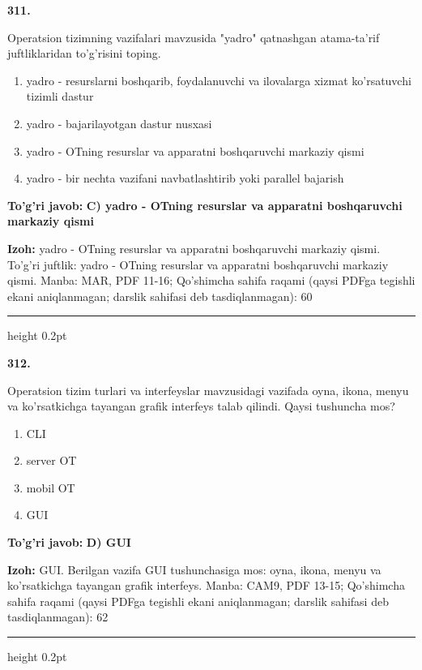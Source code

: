 \documentclass[10pt,a4paper]{article}
\begin{document}
{\bfseries\sffamily\color{ink} 311.}
\par
Operatsion tizimning vazifalari mavzusida "yadro" qatnashgan atama-ta'rif juftliklaridan to'g'risini toping.
\begin{enumerate}[label=\Alph*),leftmargin=9mm]
\item yadro - resurslarni boshqarib, foydalanuvchi va ilovalarga xizmat ko'rsatuvchi tizimli dastur
\item yadro - bajarilayotgan dastur nusxasi
\item yadro - OTning resurslar va apparatni boshqaruvchi markaziy qismi
\item yadro - bir nechta vazifani navbatlashtirib yoki parallel bajarish
\end{enumerate}
\begin{tcolorbox}[enhanced,breakable,colback=teal!4,colframe=teal!60!black,boxrule=0.45pt,arc=1.2mm,left=2.7mm,right=2.7mm,top=1.8mm,bottom=1.8mm,before skip=2mm,after skip=2mm]
{\bfseries\sffamily\color{teal}To'g'ri javob:} \textbf{C) yadro - OTning resurslar va apparatni boshqaruvchi markaziy qismi}
\par\smallskip
{\bfseries Izoh:} yadro - OTning resurslar va apparatni boshqaruvchi markaziy qismi. To'g'ri juftlik: yadro - OTning resurslar va apparatni boshqaruvchi markaziy qismi. Manba: MAR, PDF 11-16; Qo'shimcha sahifa raqami (qaysi PDFga tegishli ekani aniqlanmagan; darslik sahifasi deb tasdiqlanmagan): 60
\end{tcolorbox}
\vspace{2mm}\hrule height 0.2pt\vspace{3mm}

{\bfseries\sffamily\color{ink} 312.}
\par
Operatsion tizim turlari va interfeyslar mavzusidagi vazifada oyna, ikona, menyu va ko'rsatkichga tayangan grafik interfeys talab qilindi. Qaysi tushuncha mos?
\begin{enumerate}[label=\Alph*),leftmargin=9mm]
\item CLI
\item server OT
\item mobil OT
\item GUI
\end{enumerate}
\begin{tcolorbox}[enhanced,breakable,colback=teal!4,colframe=teal!60!black,boxrule=0.45pt,arc=1.2mm,left=2.7mm,right=2.7mm,top=1.8mm,bottom=1.8mm,before skip=2mm,after skip=2mm]
{\bfseries\sffamily\color{teal}To'g'ri javob:} \textbf{D) GUI}
\par\smallskip
{\bfseries Izoh:} GUI. Berilgan vazifa GUI tushunchasiga mos: oyna, ikona, menyu va ko'rsatkichga tayangan grafik interfeys. Manba: CAM9, PDF 13-15; Qo'shimcha sahifa raqami (qaysi PDFga tegishli ekani aniqlanmagan; darslik sahifasi deb tasdiqlanmagan): 62
\end{tcolorbox}
\vspace{2mm}\hrule height 0.2pt\vspace{3mm}
\end{document}
